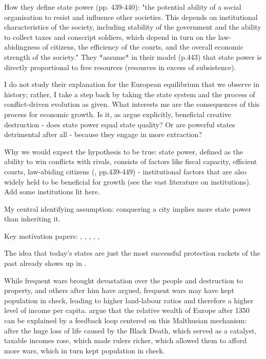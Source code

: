 \documentclass{article}
\begin{document}
How they define state power (pp. 439-440): "the potential ability of a social organisation to resist and influence other societies. This depends on institutional characteristics of the society, including stability of the government and the ability to collect taxes and conscript soldiers, which depend in turn on the law-abidingness of citizens, the efficiency of the courts, and the overall economic strength of the society." They *assume* in their model (p.443) that state power is directly proportional to free resources (resources in excess of subsistence).


I do not study their explanation for the European equilibrium that we observe in history; rather, I take a step back by taking the state system and the process of conflict-driven evolution as given. What interests me are the consequences of this process for economic growth.
Is it, as \cite{schoenholzer2022} argue explicitly, beneficial creative destruction - does state power equal state quality? Or are powerful states detrimental after all - because they engage in more extraction? \cite{tilly1985}


Why we would expect the hypothesis to be true: state power, defined as the ability to win conflicts with rivals, consists of factors like fiscal capacity, efficient courts, law-abiding citizens (\citealp{levine2021}, pp.439-449) - institutional factors that are also widely held to be beneficial for growth (see the vast literature on institutions). Add some institutions lit here.


My central identifying assumption: conquering a city implies more state power than inheriting it.






Key motivation papers: \cite{levine2013, levine2021}, \cite{diamond1997}, \cite{schoenholzer2022}, \cite{cervellati2022}, \cite{voigtlnder2013}, \cite{tilly1985}

The idea that today's states are just the most successful protection rackets of the past already shows up in \cite{tilly1985}.

While frequent wars brought devastation over the people and destruction to property, \cite{malthus1798} and others after him have argued, frequent wars may have kept population in check, leading to higher land-labour ratios and therefore a higher level of income per capita. \cite{voigtlnder2013} argue that the relative wealth of Europe after 1350 can be explained by a feedback loop centered on this Malthusian mechanism: after the huge loss of life caused by the Black Death, which served as a catalyst, taxable incomes rose, which made rulers richer, which allowed them to afford more wars, which in turn kept population in check.
\end{document}
